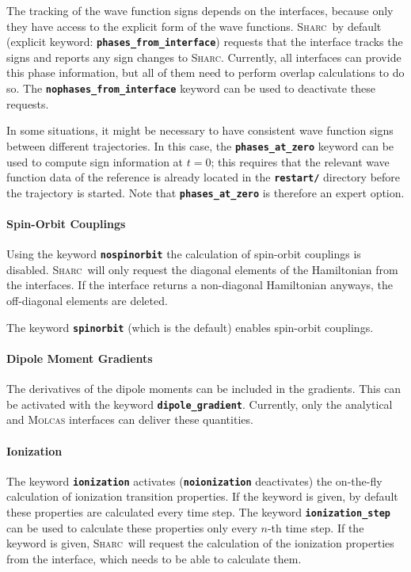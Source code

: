 \documentclass[a4paper,10pt,DIV=15,openany,twoside=false]{scrbook}
\newcommand{\sharc}{\textsc{Sharc}}
\newcommand{\ttt}[1]{\textbf{\texttt{#1}}}
\begin{document}
The tracking of the wave function signs depends on the interfaces, because only they have access to the explicit form of the wave functions. \sharc\ by default (explicit keyword: \ttt{phases\_from\_interface}) requests that the interface tracks the signs and reports any sign changes to \sharc. Currently, all interfaces can provide this phase information, but all of them need to perform overlap calculations to do so. The \ttt{nophases\_from\_interface} keyword can be used to deactivate these requests.

In some situations, it might be necessary to have consistent wave function signs between different trajectories. In this case, the \ttt{phases\_at\_zero} keyword can be used to compute sign information at $t=0$; this requires that the relevant wave function data of the reference is already located in the \ttt{restart/} directory before the trajectory is started. Note that \ttt{phases\_at\_zero} is therefore an expert option.

\paragraph{Spin-Orbit Couplings}

Using the keyword \ttt{nospinorbit} the calculation of spin-orbit couplings is disabled. \sharc\ will only request the diagonal elements of the Hamiltonian from the interfaces. If the interface returns a non-diagonal Hamiltonian anyways, the off-diagonal elements are deleted.

The keyword \ttt{spinorbit} (which is the default) enables spin-orbit couplings.

\paragraph{Dipole Moment Gradients}

The derivatives of the dipole moments can be included in the gradients. This can be activated with the keyword \ttt{dipole\_gradient}. Currently, only the analytical and \textsc{Molcas} interfaces can deliver these quantities.

\paragraph{Ionization}

The keyword \ttt{ionization} activates (\ttt{noionization} deactivates) the on-the-fly calculation of ionization transition properties. If the keyword is given, by default these properties are calculated every time step. The keyword \ttt{ionization\_step} can be used to calculate these properties only every $n$-th time step. 
If the keyword is given, \sharc\ will request the calculation of the ionization properties from the interface, which needs to be able to calculate them.
\end{document}
